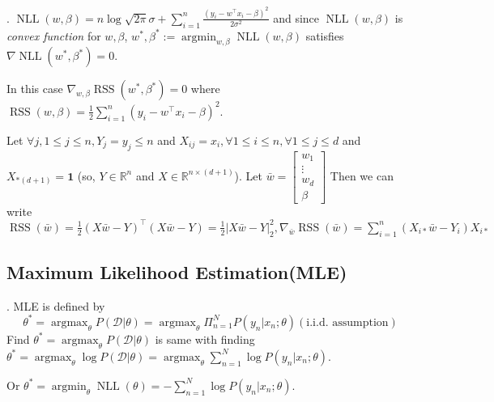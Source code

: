 \documentclass[8pt]{beamer}
\newcommand{\mbb}[1]{\mathbb{#1}}
\newcommand{\mb}[1]{\mathbf{#1}}
\newcommand{\mc}[1]{\mathcal{#1}}
\newcommand{\ti}[1]{\textit{#1}}
\newcommand{\abs}[1]{\left\lvert #1 \right\rvert}
\newcommand{\argmax}[1]{\operatorname{arg max}_{#1}}
\newcommand{\argmin}[1]{\operatorname{arg min}_{#1}}
\newcommand{\NLL}[1]{\operatorname{NLL}\!\left(#1\right)}
\newcommand{\rss}[1]{\operatorname{RSS}\!\left(#1\right)}
\begin{document}
\begin{frame}{.}
  $\NLL{w, \beta} = n \log{\sqrt{2\pi}\sigma} + \sum_{i=1}^n \frac{(y_i - w^\top x_i - \beta)^2}{2\sigma^2}$ and since $\NLL{w, \beta}$ is \ti{convex function} for $w, \beta$, $w^\ast, \beta^\ast := \argmin{w, \beta} \NLL{w, \beta}$ satisfies $\nabla \NLL{w^\ast, \beta^\ast} = 0$.

  In this case $\nabla_{w, \beta} \rss{w^\ast, \beta^\ast} = 0$ where $\rss{w, \beta} = \frac{1}{2}\sum_{i=1}^n (y_i - w^\top x_i - \beta)^2$.

  \bigskip
  Let $\forall j, 1 \leq j \leq n, Y_j = y_j \leq n$ and $X_{ij} = x_i, \forall 1 \leq i\leq n, \forall 1 \leq j \leq d$ and $X_{*(d+1)} = \mb{1}$ (so, $Y \in \mbb{R}^{n}$ and $X \in \mbb{R}^{n \times (d+1)}$). Let $\bar{w} = \left[\begin{matrix} w_1 \\ \vdots \\ w_d \\ \beta  \end{matrix}\right]$ Then we can write $\rss{\bar{w}} = \frac{1}{2} (X\bar{w} - Y)^\top (X\bar{w} - Y) =\frac{1}{2}\abs{X\bar{w} - Y}^2_2, \nabla_{\bar{w}}\rss{\bar{w}} = \sum_{i=1}^n (X_{i*} \bar{w} - Y_i) X_{i*}$
\end{frame}

\subsection{Maximum Likelihood Estimation(MLE)}

\begin{frame}{.}
  MLE is defined by
  \[
    \theta^\ast = \argmax{\theta} P(\mc{D}|\theta) = \argmax{\theta} \Pi_{n=1}^N P(y_n| x_n; \theta) (\text{i.i.d. assumption})
  \]
  Find $\theta^\ast = \argmax{\theta} P(\mc{D}|\theta)$ is same with finding $\theta^\ast = \argmax{\theta} \log{P(\mc{D}|\theta)} = \argmax{\theta} \sum_{n=1}^N \log{P(y_n|x_n; \theta)}$.

  Or $\theta^\ast = \argmin{\theta} \NLL{\theta} = - \sum_{n=1}^N \log{P(y_n|x_n;\theta)}$.
\end{frame}
\end{document}
